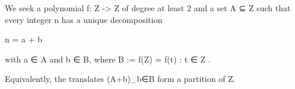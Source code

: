 We seek a polynomial f: Z -> Z of degree at least 2 and a set A ⊆ Z such that every integer n has a unique decomposition

    n = a + b

with a ∈ A and b ∈ B, where B := f(Z) = { f(t) : t ∈ Z }.

Equivalently, the translates (A+b)_{b∈B} form a partition of Z.
